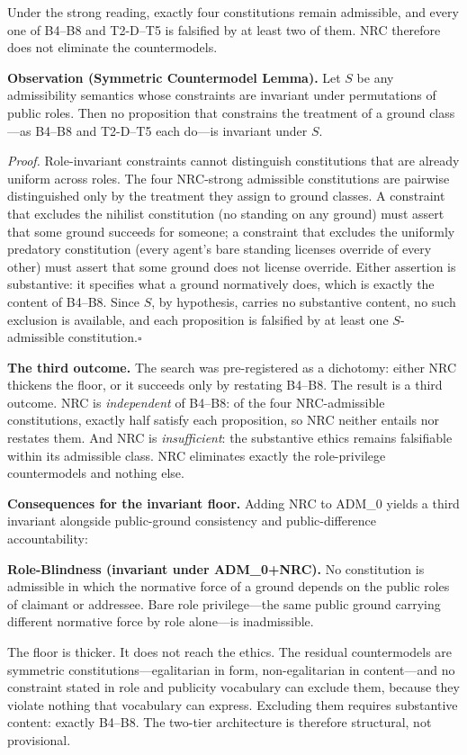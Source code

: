 \documentclass[11pt]{article}
\def\ensuremath#1{#1}%
\def\mathrm#1{#1}%
\def\mathcal#1{#1}%
\newcommand{\ADM}{\texorpdfstring{\ensuremath{\mathrm{ADM}_0}}{ADM0}}
\begin{document}
Under the strong reading, exactly four constitutions remain admissible, and every one of B4--B8 and T2-D--T5 is falsified by at least two of them. NRC therefore does not eliminate the countermodels.

\begin{paperbox}
\textbf{Observation (Symmetric Countermodel Lemma).} Let $\mathcal{S}$ be any admissibility semantics whose constraints are invariant under permutations of public roles. Then no proposition that constrains the treatment of a ground class---as B4--B8 and T2-D--T5 each do---is invariant under $\mathcal{S}$.

\emph{Proof.} Role-invariant constraints cannot distinguish constitutions that are already uniform across roles. The four NRC-strong admissible constitutions are pairwise distinguished only by the treatment they assign to ground classes. A constraint that excludes the nihilist constitution (no standing on any ground) must assert that some ground succeeds for someone; a constraint that excludes the uniformly predatory constitution (every agent's bare standing licenses override of every other) must assert that some ground does not license override. Either assertion is substantive: it specifies what a ground normatively does, which is exactly the content of B4--B8. Since $\mathcal{S}$, by hypothesis, carries no substantive content, no such exclusion is available, and each proposition is falsified by at least one $\mathcal{S}$-admissible constitution.\hfill$\square$
\end{paperbox}

\textbf{The third outcome.} The search was pre-registered as a dichotomy: either NRC thickens the floor, or it succeeds only by restating B4--B8. The result is a third outcome. NRC is \emph{independent} of B4--B8: of the four NRC-admissible constitutions, exactly half satisfy each proposition, so NRC neither entails nor restates them. And NRC is \emph{insufficient}: the substantive ethics remains falsifiable within its admissible class. NRC eliminates exactly the role-privilege countermodels and nothing else.

\textbf{Consequences for the invariant floor.} Adding NRC to \ADM{} yields a third invariant alongside public-ground consistency and public-difference accountability:
\begin{paperbox}
\textbf{Role-Blindness (invariant under \ADM{}+NRC).} No constitution is admissible in which the normative force of a ground depends on the public roles of claimant or addressee. Bare role privilege---the same public ground carrying different normative force by role alone---is inadmissible.
\end{paperbox}
The floor is thicker. It does not reach the ethics. The residual countermodels are symmetric constitutions---egalitarian in form, non-egalitarian in content---and no constraint stated in role and publicity vocabulary can exclude them, because they violate nothing that vocabulary can express. Excluding them requires substantive content: exactly B4--B8. The two-tier architecture is therefore structural, not provisional.
\end{document}
